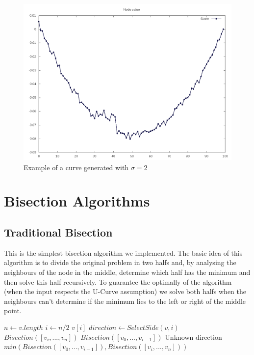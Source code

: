 \documentclass[12pt]{article}
\begin{document}
\begin{figure}[H]
\caption{Example of a curve generated with $\sigma = 2$}
\centering
\includegraphics[scale=.5]{curve_sigma2}
\end{figure}

\newpage
\section{Bisection Algorithms}
\subsection{Traditional Bisection}
This is the simplest bisection algorithm we implemented. The basic idea of this algorithm is to divide the original problem in two halfs and, by analysing the neighbours of the node in the middle, determine which half has the minimum and then solve this half recursively. To guarantee the optimally of the algorithm (when the input respects the U-Curve assumption) we solve both halfs when the neighbours can't determine if the minimum lies to the left or right of the middle point.
\begin{algorithm}[h]
\caption{}
\begin{algorithmic}[1]
    \State $n \gets v.length$
    \State $i \gets n / 2$
        \State
        \Return $v[i]$
    \Else
        \State $direction \gets SelectSide (v, i)$
            \State
            \Return $Bisection ([v_i, ..., v_n])$
            \State
            \Return $Bisection ([v_0, ..., v_{i - 1}])$
        \Else \Comment Unknown direction
            \State
            \Return $min (Bisection ([v_0, ..., v_{i - 1}]), Bisection ([v_i, ..., v_n]))$
        \EndIf
    \EndIf

\EndProcedure
\end{algorithmic}
\end{algorithm}
\end{document}
